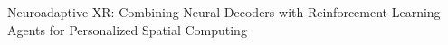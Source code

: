 
Neuroadaptive XR: Combining Neural Decoders with Reinforcement Learning Agents for Personalized Spatial Computing




